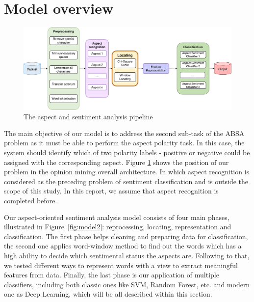 \section{Model overview}
\label{sec:overview}
\begin{figure}[h]
	\centering
	\includegraphics[width=\linewidth]{Chapter3/Figs/model.pdf}
	\caption{The aspect and sentiment analysis pipeline}
	\label{fig:model1}
\end{figure}
The main objective of our model is to address the second sub-task of the ABSA problem as it must be able to perform the aspect polarity task. In this case, the system should identify which of two polarity labels - positive or negative could be assigned with the corresponding aspect. Figure \ref{fig:model1} shows the position of our problem in the opinion mining overall architecture. In which aspect recognition is considered as the preceding problem of sentiment classification and is outside the scope of this study. In this report, we assume that aspect recognition is completed before.

Our aspect-oriented sentiment analysis model consists of four main phases, illustrated in Figure~\ref{fig:model2}: reprocessing, locating, representation and classification. The first phase helps cleaning and preparing data for classification, the second one applies word-window method to find out the words which has a high ability to decide which sentimental status the aspects are. Following to that, we tested different ways to represent words with a view to extract meaningful features from data. Finally, the last phase is our application of multiple classifiers, including both classic ones like SVM, Random Forest, etc. and modern one as Deep Learning, which will be all described within this section.

